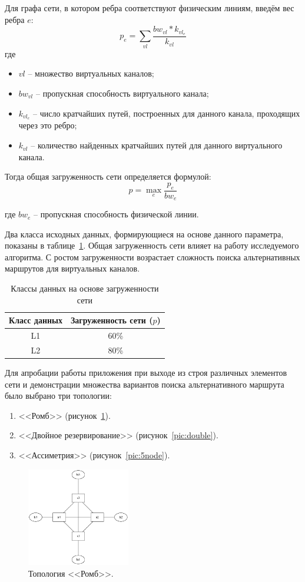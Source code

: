 \documentclass[12pt, a4paper]{article}
\begin{document}
Для графа сети, в котором ребра соответствуют физическим линиям, введём вес ребра $e$:
$$p_{e} = \sum_{vl}\frac{bw_{vl} \ast k_{vl_e}}{k_{vl}}$$
где 
\begin{itemize}
	\item $vl$ -- множество виртуальных каналов;
	\item $bw_{vl}$ -- пропускная способность виртуального канала;
	\item $k_{vl_e}$ -- число кратчайших путей, построенных для данного канала, проходящих через это ребро;
	\item $k_{vl}$ -- количество найденных кратчайших путей для данного виртуального канала.
\end{itemize}

Тогда общая загруженность сети определяется формулой:
$$p = \max_{e}\frac{p_{e}}{bw_{e}}$$

где $bw_{e}$ -- пропускная способность физической линии.

Два класса исходных данных, формирующиеся на основе данного параметра, показаны в таблице~\ref{table:loadclass}. Общая загруженность сети влияет на работу исследуемого алгоритма. С ростом загруженности возрастает сложность поиска альтернативных маршрутов для виртуальных каналов. 

\begin{table}[h]
	\caption{Классы данных на основе загруженности сети}
	\label{table:loadclass}
\begin{center}
\begin{tabular}{|c|c|}
\hline
	Класс данных & Загруженность сети ($p$)\\
\hline
	L1 & 60\% \\
\hline
	L2 & 80\% \\
\hline
\end{tabular}
\end{center}
\end{table}

Для апробации работы приложения при выходе из строя различных элементов сети и демонстрации множества вариантов поиска альтернативного маршрута было выбрано три топологии:
\begin{enumerate}
	\item <<Ромб>> (рисунок~\ref{pic:4node}).
	\item <<Двойное резервирование>> (рисунок~\ref{pic:double}).
	\item <<Ассиметрия>> (рисунок~\ref{pic:5node}).
\end{enumerate}

\begin{figure}[h!]
	\centering
	\includegraphics[width=0.40\textwidth]{img/4node.png}
	\caption{Топология <<Ромб>>.}
	\label{pic:4node}
\end{figure}
\end{document}
